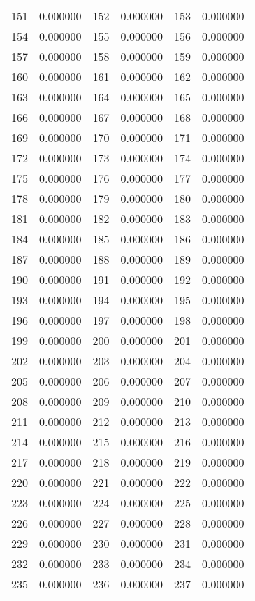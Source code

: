 \documentclass[12pt]{article}
\begin{document}
\begin{longtable}{@{}cc|cc|cc@{}}
151 & 0.000000 & 152 & 0.000000 & 153 & 0.000000 \\
154 & 0.000000 & 155 & 0.000000 & 156 & 0.000000 \\
157 & 0.000000 & 158 & 0.000000 & 159 & 0.000000 \\
160 & 0.000000 & 161 & 0.000000 & 162 & 0.000000 \\
163 & 0.000000 & 164 & 0.000000 & 165 & 0.000000 \\
166 & 0.000000 & 167 & 0.000000 & 168 & 0.000000 \\
169 & 0.000000 & 170 & 0.000000 & 171 & 0.000000 \\
172 & 0.000000 & 173 & 0.000000 & 174 & 0.000000 \\
175 & 0.000000 & 176 & 0.000000 & 177 & 0.000000 \\
178 & 0.000000 & 179 & 0.000000 & 180 & 0.000000 \\
181 & 0.000000 & 182 & 0.000000 & 183 & 0.000000 \\
184 & 0.000000 & 185 & 0.000000 & 186 & 0.000000 \\
187 & 0.000000 & 188 & 0.000000 & 189 & 0.000000 \\
190 & 0.000000 & 191 & 0.000000 & 192 & 0.000000 \\
193 & 0.000000 & 194 & 0.000000 & 195 & 0.000000 \\
196 & 0.000000 & 197 & 0.000000 & 198 & 0.000000 \\
199 & 0.000000 & 200 & 0.000000 & 201 & 0.000000 \\
202 & 0.000000 & 203 & 0.000000 & 204 & 0.000000 \\
205 & 0.000000 & 206 & 0.000000 & 207 & 0.000000 \\
208 & 0.000000 & 209 & 0.000000 & 210 & 0.000000 \\
211 & 0.000000 & 212 & 0.000000 & 213 & 0.000000 \\
214 & 0.000000 & 215 & 0.000000 & 216 & 0.000000 \\
217 & 0.000000 & 218 & 0.000000 & 219 & 0.000000 \\
220 & 0.000000 & 221 & 0.000000 & 222 & 0.000000 \\
223 & 0.000000 & 224 & 0.000000 & 225 & 0.000000 \\
226 & 0.000000 & 227 & 0.000000 & 228 & 0.000000 \\
229 & 0.000000 & 230 & 0.000000 & 231 & 0.000000 \\
232 & 0.000000 & 233 & 0.000000 & 234 & 0.000000 \\
235 & 0.000000 & 236 & 0.000000 & 237 & 0.000000 \\

\end{longtable}
\end{document}

